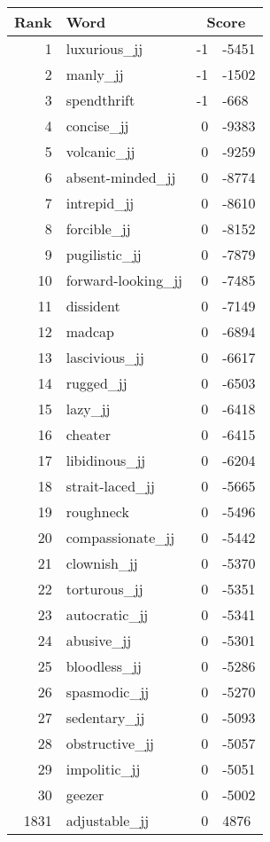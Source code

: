 \begin{longtable}[!htbp]{| rlr@{.}l |}
    \hline
    \textbf{Rank} & \textbf{Word} & \multicolumn{2}{c|}{\textbf{Score}} \\
    \hline
    \endhead
    1 & luxurious\_jj & -1 & -5451 \\
    2 & manly\_jj & -1 & -1502 \\
    3 & spendthrift & -1 & -668 \\
    4 & concise\_jj & 0 & -9383 \\
    5 & volcanic\_jj & 0 & -9259 \\
    6 & absent-minded\_jj & 0 & -8774 \\
    7 & intrepid\_jj & 0 & -8610 \\
    8 & forcible\_jj & 0 & -8152 \\
    9 & pugilistic\_jj & 0 & -7879 \\
    10 & forward-looking\_jj & 0 & -7485 \\
    11 & dissident & 0 & -7149 \\
    12 & madcap & 0 & -6894 \\
    13 & lascivious\_jj & 0 & -6617 \\
    14 & rugged\_jj & 0 & -6503 \\
    15 & lazy\_jj & 0 & -6418 \\
    16 & cheater & 0 & -6415 \\
    17 & libidinous\_jj & 0 & -6204 \\
    18 & strait-laced\_jj & 0 & -5665 \\
    19 & roughneck & 0 & -5496 \\
    20 & compassionate\_jj & 0 & -5442 \\
    21 & clownish\_jj & 0 & -5370 \\
    22 & torturous\_jj & 0 & -5351 \\
    23 & autocratic\_jj & 0 & -5341 \\
    24 & abusive\_jj & 0 & -5301 \\
    25 & bloodless\_jj & 0 & -5286 \\
    26 & spasmodic\_jj & 0 & -5270 \\
    27 & sedentary\_jj & 0 & -5093 \\
    28 & obstructive\_jj & 0 & -5057 \\
    29 & impolitic\_jj & 0 & -5051 \\
    30 & geezer & 0 & -5002 \\
    1831 & adjustable\_jj & 0 & 4876 \\

\end{longtable}
